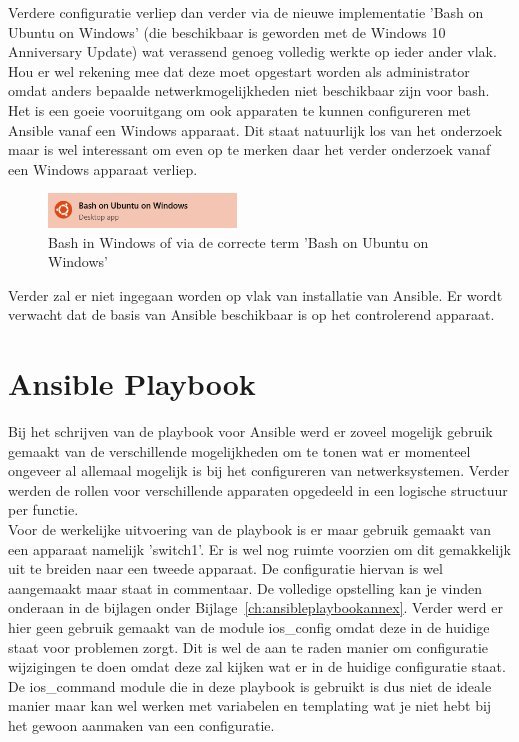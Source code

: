 Verdere configuratie verliep dan verder via de nieuwe implementatie 'Bash on Ubuntu on Windows' (die beschikbaar is geworden met de Windows 10 Anniversary Update) wat verassend genoeg volledig werkte op ieder ander vlak. Hou er wel rekening mee dat deze moet opgestart worden als administrator omdat anders bepaalde netwerkmogelijkheden niet beschikbaar zijn voor bash. Het is een goeie vooruitgang om ook apparaten te kunnen configureren met Ansible vanaf een Windows apparaat. Dit staat natuurlijk los van het onderzoek maar is wel interessant om even op te merken daar het verder onderzoek vanaf een Windows apparaat verliep. 
\\

\begin{figure}[H]
\centering
\includegraphics[width=5cm]{../img/bashonwindows}
\caption{Bash in Windows of via de correcte term 'Bash on Ubuntu on Windows' }
\end{figure}

Verder zal er niet ingegaan worden op vlak van installatie van Ansible. Er wordt verwacht dat de basis van Ansible beschikbaar is op het controlerend apparaat.

\section{Ansible Playbook}
\label{ch:ansibleplaybook}
Bij het schrijven van de playbook voor Ansible werd er zoveel mogelijk gebruik gemaakt van de verschillende mogelijkheden om te tonen wat er momenteel ongeveer al allemaal mogelijk is bij het configureren van netwerksystemen. Verder werden de rollen voor verschillende apparaten opgedeeld in een logische structuur per functie. 
\\

Voor de werkelijke uitvoering van de playbook is er maar gebruik gemaakt van een apparaat namelijk 'switch1'. Er is wel nog ruimte voorzien om dit gemakkelijk uit te breiden naar een tweede apparaat. De configuratie hiervan is wel aangemaakt maar staat in commentaar. De volledige opstelling kan je vinden onderaan in de bijlagen onder Bijlage~\ref{ch:ansibleplaybookannex}. Verder werd er hier geen gebruik gemaakt van de module ios\_config omdat deze in de huidige staat voor problemen zorgt. Dit is wel de aan te raden manier om configuratie wijzigingen te doen omdat deze zal kijken wat er in de huidige configuratie staat. De ios\_command module die in deze playbook is gebruikt is dus niet de ideale manier maar kan wel werken met variabelen en templating wat je niet hebt bij het gewoon aanmaken van een configuratie.
\\

